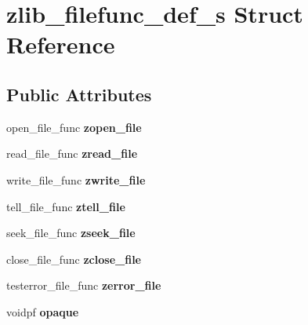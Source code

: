 \hypertarget{structzlib__filefunc__def__s}{}\section{zlib\+\_\+filefunc\+\_\+def\+\_\+s Struct Reference}
\label{structzlib__filefunc__def__s}
\subsection*{Public Attributes}
\begin{DoxyCompactItemize}
\item 
\mbox{\label{structzlib__filefunc__def__s_a49b78a559140e495b94af4d9dfe5c4e9}} 
open\+\_\+file\+\_\+func {\bfseries zopen\+\_\+file}
\item 
\mbox{\label{structzlib__filefunc__def__s_ab14f748de7516525e5d2b78c47aca92e}} 
read\+\_\+file\+\_\+func {\bfseries zread\+\_\+file}
\item 
\mbox{\label{structzlib__filefunc__def__s_a710b490fec793486ef5bedd9f2e1136d}} 
write\+\_\+file\+\_\+func {\bfseries zwrite\+\_\+file}
\item 
\mbox{\label{structzlib__filefunc__def__s_ac8b933601443cdd83f8cc02004c77d0d}} 
tell\+\_\+file\+\_\+func {\bfseries ztell\+\_\+file}
\item 
\mbox{\label{structzlib__filefunc__def__s_a4747bdf97a3f44fe4b958114c11e1dcf}} 
seek\+\_\+file\+\_\+func {\bfseries zseek\+\_\+file}
\item 
\mbox{\label{structzlib__filefunc__def__s_ac46ac7ec0540dce117dab3f210d26763}} 
close\+\_\+file\+\_\+func {\bfseries zclose\+\_\+file}
\item 
\mbox{\label{structzlib__filefunc__def__s_a61182b5b3ff83fb509b57ab4d2d9816d}} 
testerror\+\_\+file\+\_\+func {\bfseries zerror\+\_\+file}
\item 
\mbox{\label{structzlib__filefunc__def__s_a494b6d634b61bdc7fc7caed8e4fbe3f4}} 
voidpf {\bfseries opaque}
\end{DoxyCompactItemize}


